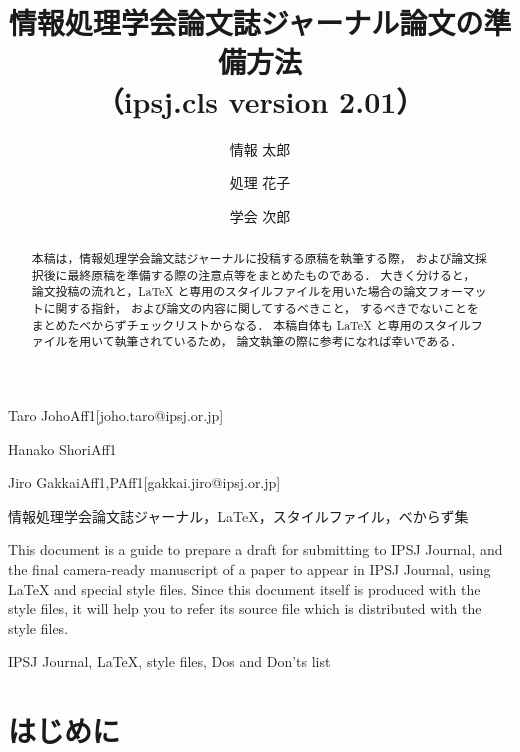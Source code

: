 \documentclass[submit]{ipsj}
\begin{document}
\title{情報処理学会論文誌ジャーナル論文の準備方法\\（ipsj.cls version 2.01）}


\author{情報 太郎}{Taro Joho}{Aff1}[joho.taro@ipsj.or.jp]
\author{処理 花子}{Hanako Shori}{Aff1}
\author{学会 次郎}{Jiro Gakkai}{Aff1,PAff1}[gakkai.jiro@ipsj.or.jp]

\begin{abstract}
本稿は，情報処理学会論文誌ジャーナルに投稿する原稿を執筆する際，
および論文採択後に最終原稿を準備する際の注意点等をまとめたものである．
大きく分けると，
論文投稿の流れと，LaTeX と専用のスタイルファイルを用いた場合の論文フォーマットに関する指針，
および論文の内容に関してするべきこと，
するべきでないことをまとめたべからずチェックリストからなる．
本稿自体も LaTeX と専用のスタイルファイルを用いて執筆されているため，
論文執筆の際に参考になれば幸いである．
\end{abstract}

\begin{jkeyword}
情報処理学会論文誌ジャーナル，LaTeX，スタイルファイル，べからず集
\end{jkeyword}

\begin{eabstract}
This document is a guide to prepare a draft for submitting to IPSJ
Journal, and the final camera-ready manuscript of a paper to appear in
IPSJ Journal, using LaTeX and special style files. Since this
document itself is produced with the style files, it will help you to
refer its source file which is distributed with the style files.
\end{eabstract}

\begin{ekeyword}
IPSJ Journal, LaTeX, style files, Dos and Don'ts list
\end{ekeyword}

\maketitle

\section{はじめに}\label{ux306fux3058ux3081ux306b}
\end{document}

